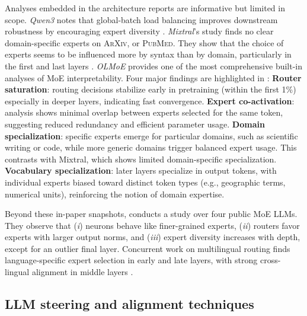 \documentclass{article} %
\begin{document}
Analyses embedded in the architecture reports are informative but limited in scope. 
\emph{Qwen3} notes that global-batch load balancing improves downstream robustness by encouraging expert diversity \citep{yang2025qwen3technicalreport}.
\emph{Mixtral}'s study finds no clear domain-specific experts on \textsc{ArXiv}, or \textsc{PubMed}. They show that the choice of experts seems to be influenced more by syntax than by domain, particularly in the first and last layers  \citep{jiang2024mixtralexperts}.
\emph{OLMoE} provides one of the most comprehensive built-in analyses of MoE interpretability. Four major findings are highlighted in \citet{muennighoff2025olmoeopenmixtureofexpertslanguage}:
\textbf{Router saturation}: routing decisions stabilize early in pretraining (within the first 1\%) especially in deeper layers, indicating fast convergence.
\textbf{Expert co-activation}: analysis shows minimal overlap between experts selected for the same token, suggesting reduced redundancy and efficient parameter usage.
\textbf{Domain specialization}: specific experts emerge for particular domains, such as scientific writing or code, while more generic domains trigger balanced expert usage. This contrasts with Mixtral, which shows limited domain-specific specialization.
\textbf{Vocabulary specialization}: later layers specialize in output tokens, with individual experts biased toward distinct token types (e.g., geographic terms, numerical units), reinforcing the notion of domain expertise. 


Beyond these in-paper snapshots, \citet{lo-etal-2025-closer} conducts a study over four public MoE LLMs.  They observe that
(\emph{i}) neurons behave like finer-grained experts,
(\emph{ii}) routers favor experts with larger output norms, and
(\emph{iii}) expert diversity increases with depth, except for an outlier final layer. Concurrent work on multilingual routing finds language-specific expert selection in early and late layers, with strong cross-lingual alignment in middle layers \citep{bandarkar2025multilingualroutingmixtureofexperts}.

\subsection{LLM steering and alignment techniques}
\end{document}

